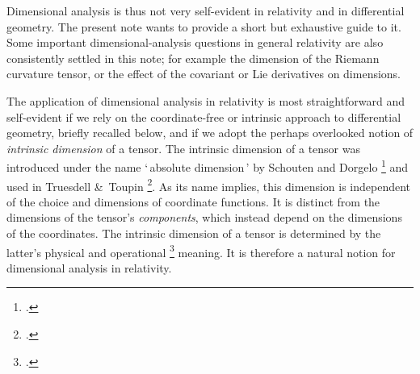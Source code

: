\documentclass[\ifafour a4paper,12pt,\else a5paper,10pt,\fi%
onecolumn,oneside,article,%
british%
]{memoir}
\newcommand*{\defquote}[1]{`\,#1\,'}
\theoremstyle{remark}
\theoremstyle{innote}
\newcommand*{\citep}{\footcites}
\newcommand*{\amp}{\&}
\renewcommand*{\|}[1][]{\nonscript\,#1\vert\nonscript\;\mathopen{}}
\newcommand*{\chap}{ch.}%
\begin{document}
\medskip

Dimensional analysis is thus not very self-evident in relativity and in
differential geometry. The present note wants to provide a short but
exhaustive guide to it.
Some important dimensional-analysis questions in general relativity are
also consistently settled in this note; for example the dimension of the
Riemann curvature tensor, or the effect of the covariant or Lie derivatives
on dimensions.

The application of dimensional analysis in relativity is most
straightforward and self-evident if we rely on the coordinate-free or
intrinsic approach to differential geometry, briefly recalled below, and if
we adopt the perhaps overlooked notion of \emph{intrinsic dimension} of a
tensor. %
The intrinsic dimension of a tensor was
introduced under the name \defquote{absolute dimension} by Schouten and
Dorgelo \citep{dorgeloetal1946}[\chap~VI]{schouten1951_r1989} and used in
Truesdell \amp\ Toupin \citep[Appendix II]{truesdelletal1960}. As its name
implies, this dimension is independent of the choice and dimensions of
coordinate functions. It is distinct from the dimensions of the tensor's
\emph{components}, which instead depend on the dimensions of the
coordinates. The intrinsic dimension of a tensor is determined by the
latter's physical and operational \citep{bridgman1927_r1958} meaning. It is
therefore a natural notion for dimensional analysis in relativity.

\medskip
\end{document}

